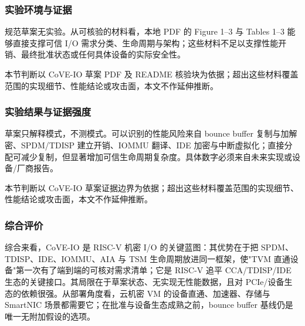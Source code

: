 \documentclass[11pt]{ctexart}
\begin{document}
\subsubsection{实验环境与证据}
规范草案无实验。从可核验的材料看，本地 PDF 的 Figure 1--3 与 Tables 1--3 能够直接支撑可信 I/O 需求分类、生命周期与架构；这些材料不足以支撑性能开销、最终批准状态或任何具体设备的实际安全性。\par
本节判断以 CoVE-IO 草案 PDF 及 README 核验块为依据；超出这些材料覆盖范围的实现细节、性能结论或攻击面，本文不作延伸推断。\par
\subsubsection{实验结果与证据强度}
草案只解释模式，不测模式。可以识别的性能风险来自 bounce buffer 复制与加解密、SPDM/TDISP 建立开销、IOMMU 翻译、IDE 加密与中断虚拟化；直接分配可减少复制，但显著增加可信生命周期复杂度。具体数字必须来自未来实现或设备/厂商报告。\par
本节判断以 CoVE-IO 草案证据边界为依据；超出这些材料覆盖范围的实现细节、性能结论或攻击面，本文不作延伸推断。\par
\subsubsection{综合评价}
综合来看，CoVE-IO 是 RISC-V 机密 I/O 的关键蓝图：其优势在于把 SPDM、TDISP、IDE、IOMMU、AIA 与 TSM 生命周期放进同一框架，使"TVM 直通设备"第一次有了端到端的可核对需求清单；它是 RISC-V 追平 CCA/TDISP/IDE 生态的关键接口。其局限在于草案状态、无实现无性能数据，且对 PCIe/设备生态的依赖很强。从部署角度看，云机密 VM 的设备直通、加速器、存储与 SmartNIC 场景都需要它；在批准与设备生态成熟之前，bounce buffer 基线仍是唯一无附加假设的选项。\par
\end{document}
